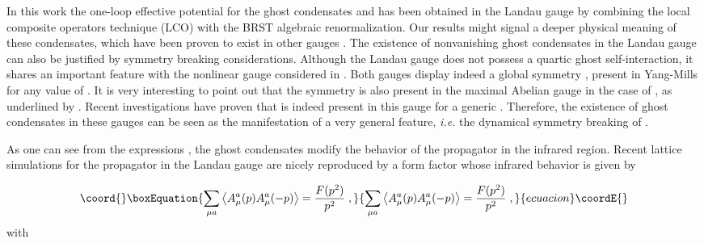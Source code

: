 \documentclass[a4paper,12pt]{article}
\begin{document}
In this work the one-loop effective potential for the ghost condensates \coordHE{} and \coordHE{}has been obtained in the Landau gauge by combining the
local composite operators  technique (LCO) with the BRST algebraic
renormalization. Our results might signal a deeper physical meaning of these
condensates, which have been proven to exist in other gauges \cite
{ms,k,sp,cf,cf1,cf2}. The existence of nonvanishing ghost condensates in the
Landau gauge can also be justified by symmetry breaking considerations.
Although the Landau gauge does not possess a quartic ghost self-interaction,
it shares an important feature with the nonlinear gauge considered in \cite
{cf,cf1,cf2}. Both gauges display indeed a global \coordHE{} symmetry \cite
{sl2r}, present in \coordHE{} Yang-Mills for any value of \coordHE{}. It is very
interesting to point out that the \coordHE{} symmetry is also present in the
maximal Abelian gauge in the case of \coordHE{}, as underlined by \cite{ms}.
Recent investigations have proven that \coordHE{} is indeed present in this
gauge for a generic \coordHE{} \cite{work}. Therefore, the existence of ghost
condensates in these gauges can be seen as the manifestation of a very
general feature, \textit{i.e. }the dynamical symmetry breaking of \coordHE{}.

As one can see from the expressions \myHighlight{$\left( \ref{prop}\right) $}\coordHE{}, the ghost
condensates modify the behavior of the propagator in the infrared region.
Recent lattice simulations for the propagator in the Landau gauge are nicely
reproduced by a form factor \coordHE{} whose infrared behavior is given by 
\cite{lg}

\begin{equation}\coord{}\boxEquation{
\sum_{\mu a}\left\langle A_{\mu }^{a}(p)A_{\mu }^{a}(-p)\right\rangle =\frac{
F(p^{2})}{p^{2}}\;,  \label{gprop}
}{
\sum_{\mu a}\left\langle A_{\mu }^{a}(p)A_{\mu }^{a}(-p)\right\rangle =\frac{
F(p^{2})}{p^{2}}\;,  }{ecuacion}\coordE{}\end{equation}
with
\end{document}
